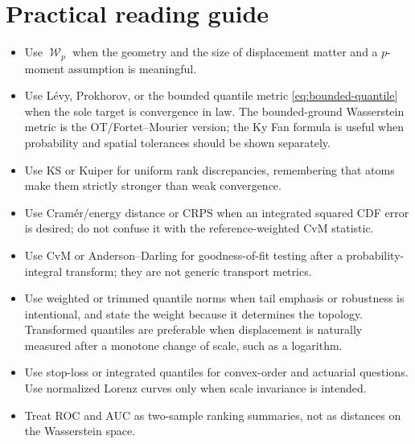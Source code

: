\documentclass[11pt]{article}
\DeclareMathOperator{\Wass}{\mathcal W}
\begin{document}
\section{Practical reading guide}

\begin{itemize}[leftmargin=2em]
\item Use $\Wass_p$ when the geometry and the size of displacement matter and a
      $p$-moment assumption is meaningful.
\item Use L\'evy, Prokhorov, or the bounded quantile metric
      \eqref{eq:bounded-quantile} when the sole target is convergence in law.
      The bounded-ground Wasserstein metric is the OT/Fortet--Mourier version;
      the Ky Fan formula is useful when probability and spatial tolerances
      should be shown separately.
\item Use KS or Kuiper for uniform rank discrepancies, remembering that atoms
      make them strictly stronger than weak convergence.
\item Use Cram\'er/energy distance or CRPS when an integrated squared CDF
      error is desired; do not confuse it with the reference-weighted CvM
      statistic.
\item Use CvM or Anderson--Darling for goodness-of-fit testing after a
      probability-integral transform; they are not generic transport metrics.
\item Use weighted or trimmed quantile norms when tail emphasis or robustness
      is intentional, and state the weight because it determines the topology.
      Transformed quantiles are preferable when displacement is naturally
      measured after a monotone change of scale, such as a logarithm.
\item Use stop-loss or integrated quantiles for convex-order and actuarial
      questions.  Use normalized Lorenz curves only when scale invariance is
      intended.
\item Treat ROC and AUC as two-sample ranking summaries, not as distances on
      the Wasserstein space.
\end{itemize}



\end{document}
